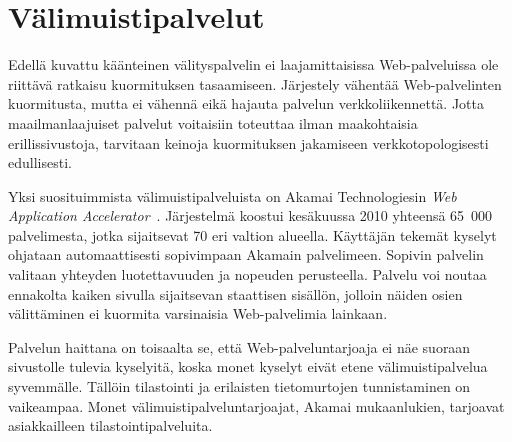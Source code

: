 \section{Välimuistipalvelut}

Edellä kuvattu käänteinen välityspalvelin ei laajamittaisissa
Web-palveluissa ole riittävä ratkaisu kuormituksen
tasaamiseen. Järjestely vähentää Web-palvelinten kuormitusta, mutta ei
vähennä eikä hajauta palvelun verkkoliikennettä. Jotta
maailmanlaajuiset palvelut voitaisiin toteuttaa ilman maakohtaisia
erillissivustoja, tarvitaan keinoja kuormituksen jakamiseen
verkkotopologisesti edullisesti.

Yksi suosituimmista välimuistipalveluista on Akamai Technologiesin
\textit{Web Ap\-plic\-a\-tion Accelerator}~\cite{akamai}. Järjestelmä
koostui kesäkuussa 2010 yhteensä 65~000 palvelimesta, jotka
sijaitsevat 70 eri valtion alueella. Käyttäjän tekemät kyselyt
ohjataan automaattisesti sopivimpaan Akamain palvelimeen. Sopivin
palvelin valitaan yhteyden luotettavuuden ja nopeuden
perusteella. Palvelu voi noutaa ennakolta kaiken sivulla sijaitsevan
staattisen sisällön, jolloin näiden osien välittäminen ei kuormita
varsinaisia Web-palvelimia lainkaan.

Palvelun haittana on toisaalta se, että Web-palveluntarjoaja ei näe
suoraan sivustolle tulevia kyselyitä, koska monet kyselyt eivät etene
välimuistipalvelua syvemmälle. Tällöin tilastointi ja erilaisten tietomurtojen
tunnistaminen on vaikeampaa. Monet välimuistipalveluntarjoajat, Akamai
mukaanlukien, tarjoavat asiakkailleen tilastointipalveluita.
